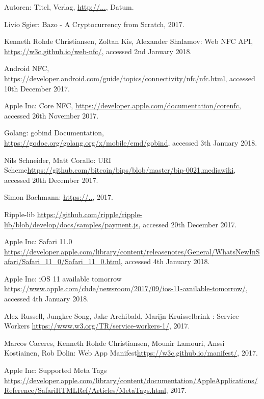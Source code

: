\begin{thebibliography}{99}

 Autoren: Titel, Verlag, \url{http://...}, Datum.

 Livio Sgier: Bazo - A Cryptocurrency from Scratch, 2017.

 Kenneth Rohde Christiansen, Zoltan Kis, Alexander Shalamov: Web NFC API, \url{https://w3c.github.io/web-nfc/}, accessed 2nd January 2018.


 Android NFC, \url{https://developer.android.com/guide/topics/connectivity/nfc/nfc.html}, accessed 10th December 2017.

 Apple Inc: Core NFC, \url{https://developer.apple.com/documentation/corenfc}, accessed 26th November 2017.

 Golang: gobind Documentation, \url{https://godoc.org/golang.org/x/mobile/cmd/gobind}, accessed 3th January 2018.

 Nils Schneider, Matt Corallo: URI Scheme\url{https://github.com/bitcoin/bips/blob/master/bip-0021.mediawiki}, accessed 20th December 2017.

 Simon Bachmann:  \url{https://..}, 2017.

 Ripple-lib  \url{https://github.com/ripple/ripple-lib/blob/develop/docs/samples/payment.js}, accessed 20th December 2017.

 Apple Inc: Safari 11.0  \url{https://developer.apple.com/library/content/releasenotes/General/WhatsNewInSafari/Safari_11_0/Safari_11_0.html}, accessed 4th January 2018.

 Apple Inc: iOS 11 available tomorrow \url{https://www.apple.com/chde/newsroom/2017/09/ios-11-available-tomorrow/}, accessed 4th January 2018.

 Alex Russell, Jungkee Song, Jake Archibald, Marijn Kruisselbrink : Service Workers \url{https://www.w3.org/TR/service-workers-1/}, 2017.

 Marcos Caceres, 
Kenneth Rohde Christiansen, Mounir Lamouri, Anssi Kostiainen, Rob Dolin: Web App Manifest\url{https://w3c.github.io/manifest/}, 2017.

 Apple Inc: Supported Meta Tags \url{https://developer.apple.com/library/content/documentation/AppleApplications/Reference/SafariHTMLRef/Articles/MetaTags.html}, 2017.


\end{thebibliography}
